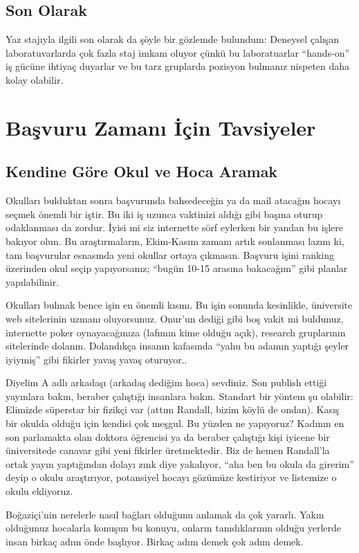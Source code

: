 \documentclass[12pt,a4paper]{article}
\begin{document}
\subsection{Son Olarak}
Yaz  stajıyla ilgili son olarak da şöyle bir gözlemde bulundum:  Deneysel çalışan laboratuvarlarda çok fazla staj imkanı oluyor çünkü bu laboratuarlar “hands-on” iş gücüne ihtiyaç duyarlar ve bu tarz gruplarda pozisyon bulmanız nispeten daha kolay olabilir. 
\newpage
%
%
\section{Başvuru Zamanı İçin Tavsiyeler}
%
\subsection{Kendine Göre Okul ve Hoca Aramak}
Okulları bulduktan sonra başvurunda bahsedeceğin ya da mail atacağın hocayı seçmek önemli bir iştir. Bu iki iş uzunca vaktinizi aldığı gibi başına oturup odaklanması da zordur. İyisi mi siz internette sörf eylerken bir yandan bu işlere bakıyor olun. Bu araştırmaların, Ekim-Kasım zamanı artık sonlanması lazım ki, tam başvurular esnasında yeni okullar ortaya çıkmasın. Başvuru işini ranking üzerinden okul seçip yapıyorsanız; “bugün 10-15 arasına bakacağım” gibi planlar yapılabilinir. 

Okulları bulmak bence işin en önemli kısmı. Bu işin sonunda kesinlikle, üniversite web sitelerinin uzmanı oluyorsunuz. Onur'un dediği gibi boş vakit mi buldunuz, internette poker oynayacağınıza (lafımın kime olduğu açık), research gruplarının sitelerinde dolanın. Dolandıkça insanın kafasında ``yahu bu adamın yaptığı şeyler iyiymiş'' gibi fikirler yavaş yavaş oturuyor.. 

Diyelim A adlı arkadaşı (arkadaş dediğim hoca) sevdiniz. Son publish ettiği yayınlara bakın, beraber çalıştığı insanlara bakın. Standart bir yöntem şu olabilir: Elimizde süperstar bir fizikçi var (attım Randall, bizim köylü de ondan). Kasış bir okulda olduğu için kendisi çok meşgul. Bu yüzden ne yapıyoruz? Kadının en son parlamakta olan doktora öğrencisi ya da beraber çalıştığı kişi iyicene bir üniversitede canavar gibi yeni fikirler üretmektedir. Biz de hemen Randall'la ortak yayın yaptığından dolayı zınk diye yakalıyor, “aha ben bu okula da girerim” deyip o okulu araştırıyor, potansiyel hocayı gözümüze kestiriyor ve listemize o okulu ekliyoruz. 

Boğaziçi'nin nerelerle nasıl bağları olduğunu anlamak da çok yararlı. Yakın olduğunuz hocalarla konuşun bu konuyu, onların tanıdıklarının olduğu yerlerde insan birkaç adım önde başlıyor. Birkaç adım demek çok adım demek. 
\end{document}
